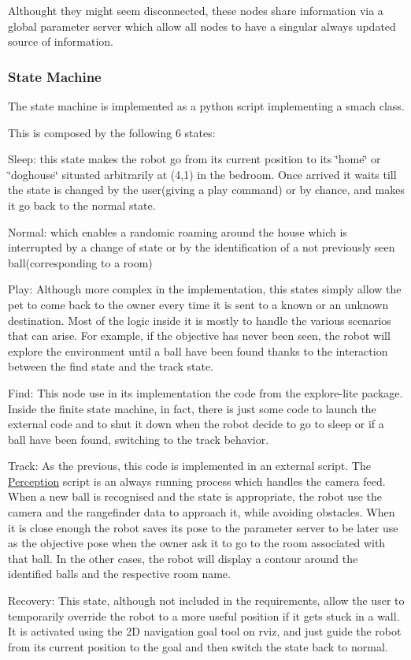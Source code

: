 Althought they might seem disconnected, these nodes share information via a global parameter server which allow all nodes to have a singular always updated source of information.

\subsubsection*{State Machine}

The state machine is implemented as a python script implementing a smach class. 

This is composed by the following 6 states\+:
\begin{DoxyItemize}
\item Sleep\+: this state makes the robot go from its current position to its \char`\"{}home\char`\"{} or \char`\"{}doghouse\char`\"{} situated arbitrarily at (4,1) in the bedroom. Once arrived it waits till the state is changed by the user(giving a play command) or by chance, and makes it go back to the normal state.
\item Normal\+: which enables a randomic roaming around the house which is interrupted by a change of state or by the identification of a not previously seen ball(corresponding to a room)
\item Play\+: Although more complex in the implementation, this states simply allow the pet to come back to the owner every time it is sent to a known or an unknown destination. Most of the logic inside it is mostly to handle the various scenarios that can arise. For example, if the objective has never been seen, the robot will explore the environment until a ball have been found thanks to the interaction between the find state and the track state. 
\item Find\+: This node use in its implementation the code from the explore-\/lite package. Inside the finite state machine, in fact, there is just some code to launch the external code and to shut it down when the robot decide to go to sleep or if a ball have been found, switching to the track behavior.
\item Track\+: As the previous, this code is implemented in an external script. The \hyperlink{namespacePerception}{Perception} script is an always running process which handles the camera feed. When a new ball is recognised and the state is appropriate, the robot use the camera and the rangefinder data to approach it, while avoiding obstacles. When it is close enough the robot saves its pose to the parameter server to be later use as the objective pose when the owner ask it to go to the room associated with that ball. In the other cases, the robot will display a contour around the identified balls and the respective room name.
\item Recovery\+: This state, although not included in the requirements, allow the user to temporarily override the robot to a more useful position if it gets stuck in a wall. It is activated using the 2D navigation goal tool on rviz, and just guide the robot from its current position to the goal and then switch the state back to normal.
\end{DoxyItemize}

